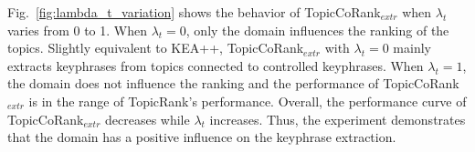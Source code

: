         Fig.~\ref{fig:lambda_t_variation} shows the behavior of TopicCoRank$_\textit{extr}$ when $\lambda_t$ varies from 0 to 1.
        When $\lambda_t = 0$, only the domain influences the ranking of the topics.
        Slightly equivalent to KEA++, TopicCoRank$_\textit{extr}$ with $\lambda_t = 0$ mainly extracts keyphrases from topics connected to controlled keyphrases.
        When $\lambda_t = 1$, the domain does not influence the ranking and the performance of TopicCoRank$_\textit{extr}$ is in the range of TopicRank's performance.
        Overall, the performance curve of TopicCoRank$_\textit{extr}$ decreases while $\lambda_t$ increases.
        Thus, the experiment demonstrates that the domain has a positive influence on the keyphrase extraction.
        
        
        
